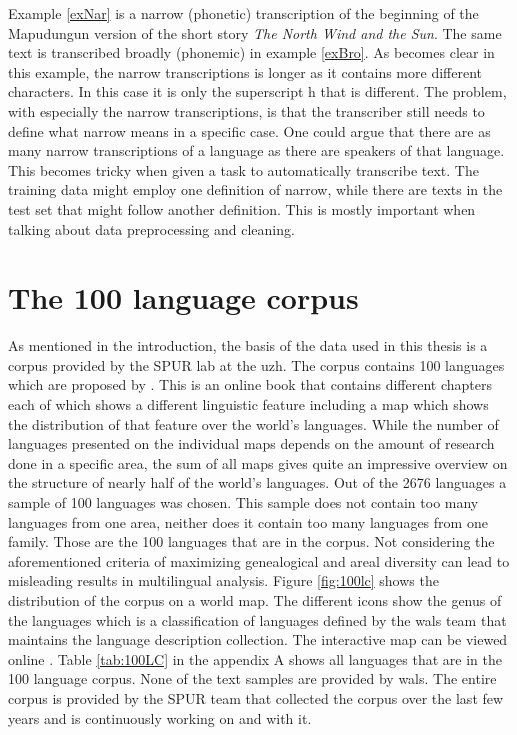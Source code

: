 Example \ref{exNar} is a narrow (phonetic) transcription of the beginning of the Mapudungun version of the short story \textit{The North Wind and the Sun}. The same text is transcribed broadly (phonemic) in example \ref{exBro}. As becomes clear in this example, the narrow transcriptions is longer as it contains more different characters. In this case it is only the superscript h that is different. The problem, with especially the narrow transcriptions, is that the transcriber still needs to define what narrow means in a specific case. One could argue that there are as many narrow transcriptions of a language as there are speakers of that language. This becomes tricky when given a task to automatically transcribe text. The training data might employ one definition of narrow, while there are texts in the test set that might follow another definition. This is mostly important when talking about data preprocessing and cleaning.
  
\section{The 100 language corpus}
\label{sec:corpus}
As mentioned in the introduction, the basis of the data used in this thesis is a corpus provided by the SPUR lab at the \ac{uzh}. The corpus contains 100 languages which are proposed by \citet{Comrie&Dryer.2013}. This is an online book that contains different chapters each of which shows a different linguistic feature including a map which shows the distribution of that feature over the world's languages. While the number of languages presented on the individual maps depends on the amount of research done in a specific area, the sum of all maps gives quite an impressive overview on the structure of nearly half of the world's languages. Out of the 2676 languages a sample of 100 languages was chosen. This sample does not contain too many languages from one area, neither does it contain too many languages from one family. Those are the 100 languages that are in the corpus. Not considering the aforementioned criteria of maximizing genealogical and areal diversity can lead to misleading results in multilingual analysis. Figure \ref{fig:100lc} shows the distribution of the corpus on a world map. The different icons show the genus of the languages which is a classification of languages defined by the \ac{wals} team that maintains the language description collection. The interactive map can be viewed online \citep{100LC.21.07.2021}. Table \ref{tab:100LC} in the appendix A shows all languages that are in the 100 language corpus. None of the text samples are provided by \ac{wals}. The entire corpus is provided by the SPUR team that collected the corpus over the last few years and is continuously working on and with it.

